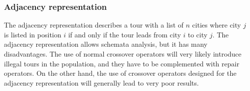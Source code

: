 \documentclass[a4paper,english,11pt,]{scrartcl}
\begin{document}
\subsubsection{Adjacency representation}

The adjacency representation describes a tour with a list of $n$ cities where city $j$ is listed in position $i$ if and only if the tour leads from city $i$ to city $j$. The adjacency representation allows schemata analysis, but it has many disadvantages. The use of normal crossover operators will very likely introduce illegal tours in the population, and they have to be complemented with repair operators. On the other hand, the use of crossover operators designed for the adjacency representation will generally lead to very poor results. 
\end{document}
